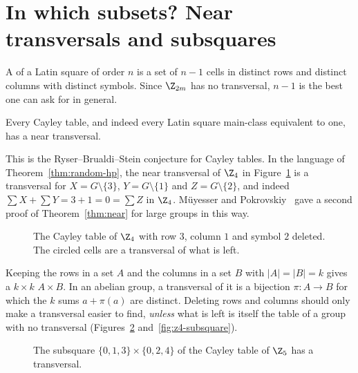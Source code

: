 \section{In which subsets? Near transversals and subsquares}\label{sec:subsquares}


A  of a Latin square of order $n$ is a set of $n-1$ cells in distinct rows and distinct columns with distinct symbols. Since $\Z_{2m}$ has no transversal, $n-1$ is the best one can ask for in general.

\begin{theorem}\label{thm:near}
Every Cayley table, and indeed every Latin square main-class equivalent to one, has a near transversal.
\end{theorem}

This is the Ryser--Brualdi--Stein conjecture for Cayley tables. In the language of Theorem~\ref{thm:random-hp}, the near transversal of $\Z_4$ in Figure~\ref{fig:z4-near} is a transversal for $X=G\setminus\{3\}$, $Y=G\setminus\{1\}$ and $Z=G\setminus\{2\}$, and indeed $\sum X+\sum Y=3+1=0=\sum Z$ in $\Z_4$. M\"uyesser and Pokrovskiy~\cite{mp25a} gave a second proof of Theorem~\ref{thm:near} for large groups in this way.

\begin{figure}[ht]
\centering

\caption{The Cayley table of $\Z_4$ with row $3$, column $1$ and symbol $2$ deleted. The circled cells are a transversal of what is left.}
\label{fig:z4-near}
\end{figure}


Keeping the rows in a set $A$ and the columns in a set $B$ with $|A|=|B|=k$ gives a $k\times k$  $A\times B$. In an abelian group, a transversal of it is a bijection $\pi\colon A\to B$ for which the $k$ sums $a+\pi(a)$ are distinct. Deleting rows and columns should only make a transversal easier to find, \emph{unless} what is left is itself the table of a group with no transversal (Figures~\ref{fig:z5-subsquare} and~\ref{fig:z4-subsquare}).

\begin{figure}[ht]
\centering

\caption{The subsquare $\{0,1,3\}\times\{0,2,4\}$ of the Cayley table of $\Z_5$ has a transversal.}
\label{fig:z5-subsquare}
\end{figure}

